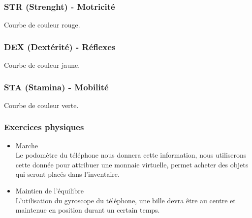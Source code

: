 \documentclass[a4paper,12pt,francais]{article}
\begin{document}
\subsubsection{STR (Strenght) - Motricité}
Courbe de couleur rouge.

\subsubsection{DEX (Dextérité) - Réflexes}
Courbe de couleur jaune.

\subsubsection{STA (Stamina) - Mobilité}
Courbe de couleur verte.




\iffalse
\subsubsection{Exercices physiques}
\begin{itemize}
	\item Marche\\
		Le podomètre du téléphone nous donnera cette information, nous utiliserons cette donnée pour attribuer une monnaie virtuelle, permet acheter des objets qui seront placés dans l'inventaire.
	\item Maintien de l'équilibre\\
		L'utilisation du gyroscope du téléphone, une bille devra être au centre et maintenue en position durant un certain temps.
\end{itemize}
\end{document}
